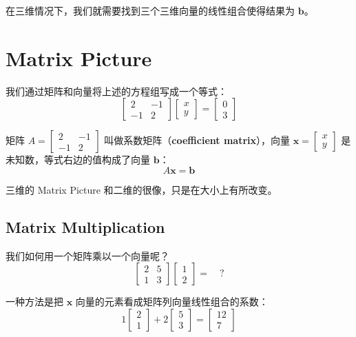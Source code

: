 \documentclass[green, cn, normal]{elegantnote}
\begin{document}
	在三维情况下，我们就需要找到三个三维向量的线性组合使得结果为 $\textbf{b}$。
	
	\section{Matrix Picture}
	
	我们通过矩阵和向量将上述的方程组写成一个等式：
	\[
	\begin{bmatrix}
	2 & -1 \\
	-1 & 2
	\end{bmatrix} \begin{bmatrix}
	x \\
	y
	\end{bmatrix} = \begin{bmatrix}
	0 \\ 3
	\end{bmatrix}
	\]
	
	矩阵 $A = \begin{bmatrix}
	2 & -1 \\
	-1 & 2
	\end{bmatrix}$ 叫做系数矩阵（\textbf{coefficient matrix}），向量 $\textbf{x} = \begin{bmatrix}
	x \\
	y
	\end{bmatrix}$ 是未知数，等式右边的值构成了向量 $\textbf{b}$：
	\[
	A\textbf{x} = \textbf{b}
	\]
	
	三维的 Matrix Picture 和二维的很像，只是在大小上有所改变。
	
	\subsection{Matrix Multiplication}
	
	我们如何用一个矩阵乘以一个向量呢？
	\[
	\begin{bmatrix}
	2 & 5 \\
	1 & 3
	\end{bmatrix} \begin{bmatrix}
	1 \\
	2
	\end{bmatrix} = \quad ?
	\]
	
	一种方法是把 $\textbf{x}$ 向量的元素看成矩阵列向量线性组合的系数：
	\[
	1 \begin{bmatrix}
	2 \\
	1
	\end{bmatrix} + 2 \begin{bmatrix}
	5 \\ 
	3
	\end{bmatrix} = \begin{bmatrix}
	12 \\
	7
	\end{bmatrix}
	\]
	
\end{document}
